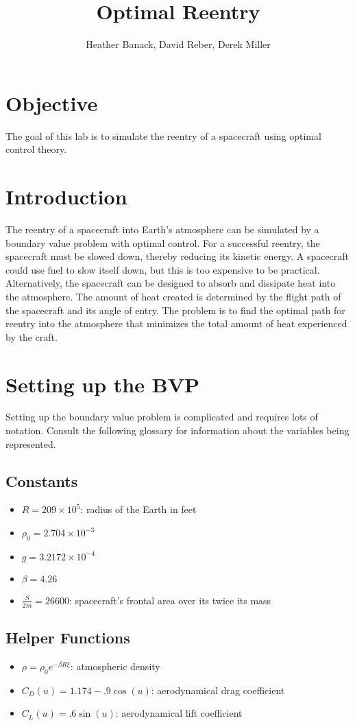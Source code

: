 \documentclass{article}
\title{Optimal Reentry}
\author{Heather Banack, David Reber, Derek Miller}
\begin{document}
\maketitle

\section*{Objective}The goal of this lab is to simulate the reentry of a spacecraft using optimal control theory.

\section*{Introduction}

The reentry of a spacecraft into Earth's atmosphere can be simulated by a boundary value problem with optimal control. For a successful reentry, the spacecraft must be slowed down, thereby reducing its kinetic energy. A spacecraft could use fuel to slow itself down, but this is too expensive to be practical. Alternatively, the spacecraft can be designed to absorb and dissipate heat into the atmosphere. The amount of heat created is determined by the flight path of the spacecraft and its angle of entry. The problem is to find the optimal path for reentry into the atmosphere that minimizes the total amount of heat experienced by the craft.

\section*{Setting up the BVP}

Setting up the boundary value problem is complicated and requires lots of notation. Consult the following glossary for information about the variables being represented.
\subsection*{Constants}
\begin{itemize}
    \item $R = 209\times 10^5$: radius of the Earth in feet
    \item $\rho_0 = 2.704\times 10^{-3}$
    \item $g = 3.2172\times 10^{-4}$
    \item $\beta = 4.26$
    \item $\frac{S}{2m} = 26600$: spacecraft's frontal area over its twice its mass
\end{itemize}
\subsection*{Helper Functions}
\begin{itemize}
    \item $\rho = \rho_0 e^{-\beta R \xi}$: atmospheric density
    \item $C_D(u) = 1.174 - .9\cos(u)$: aerodynamical drag coefficient
    \item $C_L(u) = .6\sin(u)$: aerodynamical lift coefficient
\end{itemize}
\end{document}

